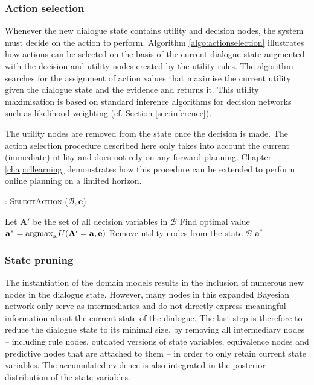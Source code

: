 \subsubsection*{Action selection}

Whenever the new dialogue state contains utility and decision nodes, the system must decide on the action to perform.  Algorithm \ref{algo:actionselection} illustrates how actions can be selected on the basis of the current dialogue state augmented with the decision and utility nodes created by the utility rules. The algorithm searches for the assignment of action values that maximise the current utility given the dialogue state and the evidence and returns it. This utility maximisation is based on standard inference algorithms for decision networks such as likelihood weighting (cf. Section \ref{sec:inference}). 

The utility nodes are removed from the state once the decision is made. The action selection procedure described here only takes into account the current (immediate) utility and does not rely on any forward planning.  Chapter \ref{chap:rllearning} demonstrates how this procedure can be extended to perform online planning on a limited horizon.  \\

\begin{algorithm}[h]
\caption{: \textsc{SelectAction} ($\mathcal{B}, \mathbf{e}$)}
\begin{algorithmic}[1] \vspace{1mm}
\STATE Let $\mathbf{A}'$ be the set of all decision variables in $\mathcal{B}$
\STATE Find optimal value $\mathbf{a}^* = \argmax_{\mathbf{a}} U(\mathbf{A}' = \mathbf{a}, \mathbf{e})$
\STATE Remove utility nodes from the state $\mathcal{B}$
\RETURN $\mathbf{a}^*$
\end{algorithmic}
\label{algo:actionselection}
\end{algorithm}


\subsubsection*{State pruning}

The instantiation of the domain models results in the inclusion of numerous new nodes in the dialogue state. However, many nodes in this expanded Bayesian network  only serve as intermediaries and do not directly express meaningful information about the current state of the dialogue. The last step is therefore to reduce the dialogue state to its minimal size, by removing all intermediary nodes -- including rule nodes, outdated versions of state variables, equivalence nodes and predictive nodes that are attached to them -- in order to only retain current state variables. The accumulated evidence is also integrated in the posterior distribution of the state variables.

